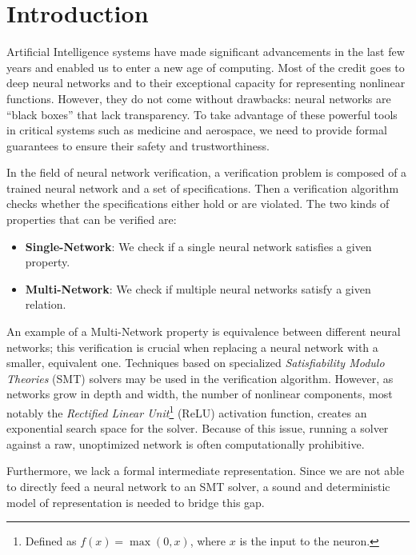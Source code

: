 \chapter{Introduction}
\label{ch:introduction}

Artificial Intelligence systems have made significant advancements in the last few years and enabled
us to enter a new age of computing. Most of the credit goes to deep neural networks and to their
exceptional capacity for representing nonlinear functions. However, they do not come without
drawbacks: neural networks are ``black boxes'' that lack transparency. To take advantage of these
powerful tools in critical systems such as medicine and aerospace, we need to provide formal
guarantees to ensure their safety and trustworthiness.

In the field of neural network verification, a verification problem is composed of a trained neural
network and a set of specifications. Then a verification algorithm checks whether the specifications
either hold or are violated. The two kinds of properties that can be verified are:
\begin{itemize}
	\item \textbf{Single-Network}: We check if a single neural network satisfies a given property.
	\item \textbf{Multi-Network}: We check if multiple neural networks satisfy a given relation.
\end{itemize}
An example of a Multi-Network property is equivalence between different neural networks; this
verification is crucial when replacing a neural network with a smaller, equivalent one. Techniques
based on specialized \textit{Satisfiability Modulo Theories} (SMT) solvers may be used in the verification
algorithm. However, as networks grow in depth and width, the number of nonlinear components, most
notably the \textit{Rectified Linear Unit}\footnote{Defined as $f(x)=\max(0, x)$, where $x$ is the input to the
neuron.} (ReLU) activation function, creates an exponential search space for the solver. Because of
this issue, running a solver against a raw, unoptimized network is often computationally prohibitive.

Furthermore, we lack a formal intermediate representation. Since we are
not able to directly feed a neural network to an SMT solver, a sound and deterministic model of
representation is needed to bridge this gap.

